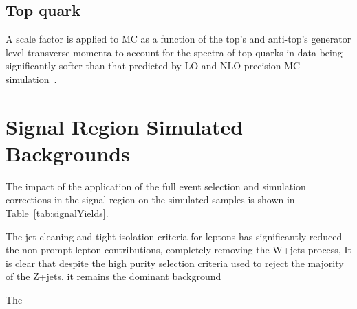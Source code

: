 \subsection{Top quark \pt}
A scale factor is applied to \ttbar MC as a function of the top's and anti-top's generator level transverse momenta to account for the \pt spectra of top quarks in data being significantly softer than that predicted by LO and NLO precision MC simulation~\cite{Khachatryan:2015oqa}.


\section{Signal Region Simulated Backgrounds}\label{sec:simBackgrounds}
The impact of the application of the full event selection and simulation corrections in the signal region on the simulated samples is shown in Table~\ref{tab:signalYields}.

The jet cleaning and tight isolation criteria for leptons has significantly reduced the non-prompt lepton contributions, completely removing the W+jets process,
It is clear that despite the high purity selection criteria used to reject the majority of the Z+jets, it remains the dominant background

The 

